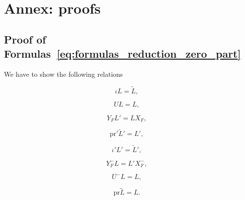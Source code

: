 \documentclass{ifacconf}
\newcommand\p{\text{pr}}
\begin{document}
\section{Annex: proofs}\label{sec:annex}

\subsection{Proof of Formulas~\eqref{eq:formulas_reduction_zero_part}}
\label{sec:proofs_reduction_zero_part}

We have to show the following relations
\vspace{-0.4cm}
\begin{small}
  \setlength{\columnsep}{-0.2cm}
  \begin{multicols}{3}
    \begin{equation}\label{equ:eq1_zero_part}
      \iota L=\tilde{L},
    \end{equation}
    
    \begin{equation}\label{equ:eq2_zero_part}
      UL=L,
    \end{equation}
    
    \begin{equation}\label{equ:eq3_zero_part}
      Y_FL'=LX_F,
    \end{equation}
    
    \begin{equation}\label{equ:eq4_zero_part}
      \p'\tilde{L}'=L',
    \end{equation}
    
    \begin{equation}\label{equ:eq5_zero_part}
      \iota'L'=\tilde{L}',
    \end{equation}
    
    \begin{equation}\label{equ:eq6_zero_part}
      Y_F^-L=L'X_F^-,
    \end{equation}
    
    \begin{equation}\label{equ:eq7_zero_part}
      U^-L=L,
    \end{equation}
    
    \begin{equation}\label{equ:eq8_zero_part}
      \p\tilde{L}=L.
    \end{equation}
  \end{multicols}
\end{small}
\end{document}
